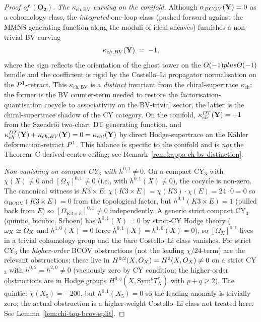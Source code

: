 \begin{proof}[Proof of $(\mathbf{O_2})$]
\emph{The $\kappa_{\mathrm{ch,BV}}$ curving on the conifold.} Although
$\alpha_{BCOV}(\mathbf{Y}) = 0$ as a cohomology class, the
\emph{integrated} one-loop class (pushed forward against the MMNS
generating function along the moduli of ideal sheaves) furnishes a
non-trivial BV curving
\[
  \kappa_{ch,BV}(\mathbf{Y}) \;=\; -1,
\]
where the sign reflects the orientation of the ghost tower on the
$O(-1)plusO(-1)$ bundle and the coefficient is rigid by the
Costello--Li propagator normalisation on the $P^1$-retract. This
$\kappa_{\mathrm{ch,BV}}$ is a \emph{distinct} invariant from the
chiral-supertrace $\kappa_{\mathrm{ch}}$: the former is the BV
counter-term needed to restore the factorisation-quantisation
cocycle to associativity on the BV-trivial sector, the latter is the
chiral-supertrace shadow of the CY category. On the
conifold, $\kappa_{ch}^{DT}(\mathbf{Y}) = +1$ from the
Szendr\H oi two-chart DT generating function, and
$\kappa_{ch}^{DT}(\mathbf{Y}) + \kappa_{ch,BV}(\mathbf{Y})
= 0 = \kappa_{cat}(\mathbf{Y})$ by direct Hodge-supertrace on the
K\"ahler deformation-retract $P^1$. This balance is specific to the
conifold and is \emph{not} the Theorem~C derived-centre ceiling; see
Remark~\ref{rem:kappa-ch-bv-distinction}.

\emph{Non-vanishing on compact CY$_3$ with $h^{0,1} \neq 0$.} On a
compact CY$_3$ with $\chi(X) \neq 0$ and $[\Omega_X]^{0,1} \neq 0$
(i.e., with $h^{0,1}(X) \neq 0$), the cocycle is non-zero. The
canonical witness is $K3 \times E$: $\chi(K3 \times E) = \chi(K3)
\cdot \chi(E) = 24 \cdot 0 = 0$ so $\alpha_{\mathrm{BCOV}}(K3 \times E)
= 0$ from the topological factor, but $h^{0,1}(K3 \times E) = 1$
(pulled back from $E$) so $[\Omega_{K3 \times E}]^{0,1} \neq 0$
independently. A generic strict compact CY$_3$ (quintic, bicubic,
Schoen) has $h^{0,1}(X) = 0$ by strict-CY Hodge theory
($\omega_X \simeq O_X$ and $h^{1,0}(X) = 0$ force
$h^{0,1}(X) = h^{1,0}(X) = 0$), so $[\Omega_X]^{0,1}$ lives in a
trivial cohomology group and the bare Costello--Li class vanishes.
For strict CY$_3$ the \emph{higher-order} BCOV obstructions (not the
leading $\chi/24$-term) are the relevant obstructions; these live in
$H^{0,2}(X, O_X) = H^2(X, O_X) \neq 0$ on a strict CY$_3$ with
$h^{0,2} = h^{2,0} \neq 0$ (vacuously zero by CY condition; the
higher-order obstructions are in Hodge groups
$H^{0,q}(X, \mathrm{Sym}^p T_X^\ast)$ with $p + q \geq 2$). The
quintic: $\chi(X_5) = -200$, but $h^{0,1}(X_5) = 0$ so the leading
anomaly is trivially zero; the actual obstruction is a higher-weight
Costello--Li class not treated here. See
Lemma~\ref{lem:chi-top-bcov-split}.


\end{proof}
